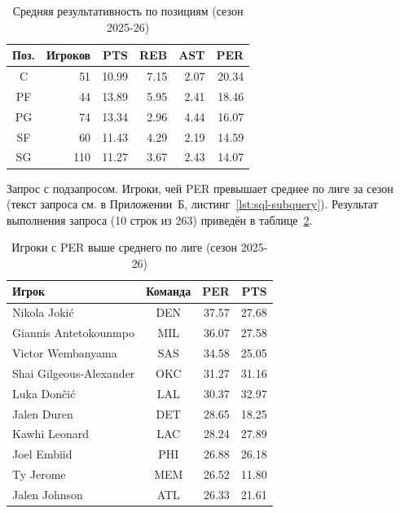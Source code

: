 {\footnotesize\setlength{\tabcolsep}{4pt}\renewcommand{\arraystretch}{1.15}
\begin{table}[H]
\caption{Средняя результативность по позициям (сезон 2025-26)}
\label{tab:sql-group-result}
\centering
\begin{tabular}{|c|r|r|r|r|r|}
\hline
\textbf{Поз.} & \textbf{Игроков} & \textbf{PTS} & \textbf{REB} & \textbf{AST} & \textbf{PER} \\
\hline
C  & 51  & 10.99 & 7.15 & 2.07 & 20.34 \\
PF & 44  & 13.89 & 5.95 & 2.41 & 18.46 \\
PG & 74  & 13.34 & 2.96 & 4.44 & 16.07 \\
SF & 60  & 11.43 & 4.29 & 2.19 & 14.59 \\
SG & 110 & 11.27 & 3.67 & 2.43 & 14.07 \\
\hline
\end{tabular}
\end{table}}

Запрос с подзапросом. Игроки, чей PER превышает среднее
по лиге за сезон (текст запроса см. в Приложении~Б,
листинг~\ref{lst:sql-subquery}).
Результат выполнения запроса (10 строк из 263) приведён
в таблице~\ref{tab:sql-subquery-result}.

{\footnotesize\setlength{\tabcolsep}{4pt}\renewcommand{\arraystretch}{1.15}
\begin{table}[H]
\caption{Игроки с PER выше среднего по лиге (сезон 2025-26)}
\label{tab:sql-subquery-result}
\centering
\begin{tabular}{|l|c|r|r|}
\hline
\textbf{Игрок} & \textbf{Команда} & \textbf{PER} & \textbf{PTS} \\
\hline
Nikola Jokić              & DEN & 37.57 & 27.68 \\
Giannis Antetokounmpo     & MIL & 36.07 & 27.58 \\
Victor Wembanyama         & SAS & 34.58 & 25.05 \\
Shai Gilgeous-Alexander   & OKC & 31.27 & 31.16 \\
Luka Dončić               & LAL & 30.37 & 32.97 \\
Jalen Duren               & DET & 28.65 & 18.25 \\
Kawhi Leonard             & LAC & 28.24 & 27.89 \\
Joel Embiid               & PHI & 26.88 & 26.18 \\
Ty Jerome                 & MEM & 26.52 & 11.80 \\
Jalen Johnson             & ATL & 26.33 & 21.61 \\
\hline
\end{tabular}
\end{table}}

